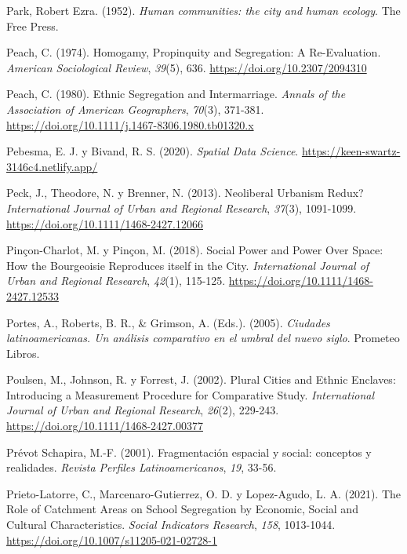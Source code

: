 \documentclass[
  spanish,
  a4paper,%
  chapterprefix=true,%
  DIV=calc,%
  twoside]{scrbook}%
\newlength{\cslhangindent}
\newenvironment{CSLReferences}[2] %
 {\begin{list}{}{%
  \setlength{\itemindent}{0pt}
  \setlength{\leftmargin}{0pt}
  \setlength{\parsep}{0pt}
  \ifodd #1
   \setlength{\leftmargin}{\cslhangindent}
   \setlength{\itemindent}{-1\cslhangindent}
  \fi
  \setlength{\itemsep}{#2\baselineskip}}}
 {\end{list}}
\begin{document}
\begin{CSLReferences}{1}{0}
Park, Robert Ezra. (1952). \emph{Human communities: the city and human ecology}. The Free Press.

Peach, C. (1974). Homogamy, Propinquity and Segregation: A Re-Evaluation. \emph{American Sociological Review}, \emph{39}(5), 636. \url{https://doi.org/10.2307/2094310}

Peach, C. (1980). Ethnic Segregation and Intermarriage. \emph{Annals of the Association of American Geographers}, \emph{70}(3), 371-381. \url{https://doi.org/10.1111/j.1467-8306.1980.tb01320.x}

Pebesma, E. J. y Bivand, R. S. (2020). \emph{Spatial Data Science}. \url{https://keen-swartz-3146c4.netlify.app/}

Peck, J., Theodore, N. y Brenner, N. (2013). Neoliberal Urbanism Redux? \emph{International Journal of Urban and Regional Research}, \emph{37}(3), 1091-1099. \url{https://doi.org/10.1111/1468-2427.12066}

Pinçon-Charlot, M. y Pinçon, M. (2018). Social Power and Power Over Space: How the Bourgeoisie Reproduces itself in the City. \emph{International Journal of Urban and Regional Research}, \emph{42}(1), 115-125. \url{https://doi.org/10.1111/1468-2427.12533}

Portes, A., Roberts, B. R., \& Grimson, A. (Eds.). (2005). \emph{Ciudades latinoamericanas. Un análisis comparativo en el umbral del nuevo siglo}. Prometeo Libros.

Poulsen, M., Johnson, R. y Forrest, J. (2002). Plural Cities and Ethnic Enclaves: Introducing a Measurement Procedure for Comparative Study. \emph{International Journal of Urban and Regional Research}, \emph{26}(2), 229-243. \url{https://doi.org/10.1111/1468-2427.00377}

Prévot Schapira, M.-F. (2001). Fragmentación espacial y social: conceptos y realidades. \emph{Revista Perfiles Latinoamericanos}, \emph{19}, 33-56.

Prieto-Latorre, C., Marcenaro-Gutierrez, O. D. y Lopez-Agudo, L. A. (2021). The Role of Catchment Areas on School Segregation by Economic, Social and Cultural Characteristics. \emph{Social Indicators Research}, \emph{158}, 1013-1044. \url{https://doi.org/10.1007/s11205-021-02728-1}


\end{CSLReferences}
\end{document}
